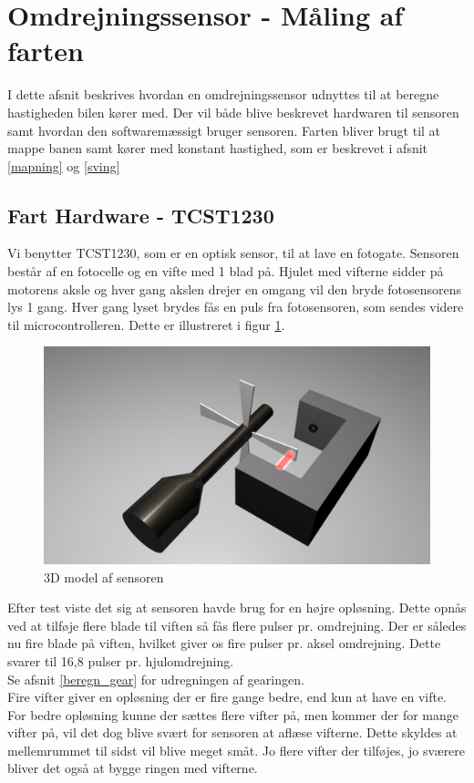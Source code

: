 \section{Omdrejningssensor - Måling af farten}
\label{fartmål}
I dette afsnit beskrives hvordan en omdrejningssensor udnyttes til at beregne hastigheden bilen kører med. Der vil både blive beskrevet hardwaren til sensoren samt hvordan den softwaremæssigt bruger sensoren. Farten bliver brugt til at mappe banen samt kører med konstant hastighed, som er beskrevet i afsnit \ref{mapning} og \ref{sving} \\

\subsection{Fart Hardware - TCST1230}
\label{fartmål_hardware}
Vi benytter TCST1230, som er en optisk sensor, til at lave en fotogate. Sensoren består af en fotocelle og en vifte med 1 blad på. Hjulet med vifterne sidder på motorens aksle og hver gang akslen drejer en omgang vil den bryde fotosensorens lys 1 gang. Hver gang lyset brydes fås en puls fra fotosensoren, som sendes videre til microcontrolleren. Dette er illustreret i figur \ref{wheelspeed3D}.

\begin{figure}[h!]
\center
\includegraphics[scale=0.2]{./Graphics/Wheelspeed_D}
\caption{3D model af sensoren}
\label{wheelspeed3D}
\end{figure}

Efter test viste det sig at sensoren havde brug for en højre opløsning. Dette opnås ved at tilføje flere blade til viften så fås flere pulser pr. omdrejning. Der er således nu fire blade på viften, hvilket giver os fire pulser pr. aksel omdrejning. Dette svarer til 16,8 pulser pr. hjulomdrejning. \\
Se afsnit \ref{beregn_gear} for udregningen af gearingen. \\
Fire vifter giver en opløsning der er fire gange bedre, end kun at have en vifte. \\
For bedre opløsning kunne der sættes flere vifter på, men kommer der for mange vifter på, vil det dog blive svært for sensoren at aflæse vifterne. Dette skyldes at mellemrummet til sidst vil blive meget småt. Jo flere vifter der tilføjes, jo sværere bliver det også at bygge ringen med vifterne. \\

